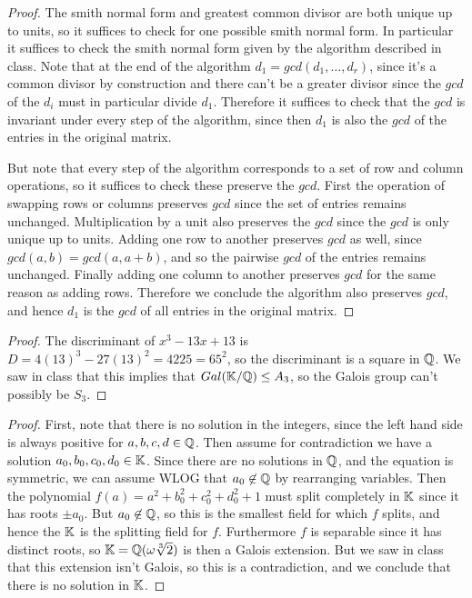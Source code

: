 \documentclass[11pt]{article}
\begin{document}
\begin{proof}
  The smith normal form and greatest common divisor are both unique up to units, so it suffices to check for one possible smith normal form.
  In particular it suffices to check the smith normal form given by the algorithm described in class.
  Note that at the end of the algorithm $d_1 = gcd(d_1,\dots,d_r)$, since it's a common divisor by construction and there can't be a greater divisor since the $gcd$ of the $d_i$ must in particular divide $d_1$.
  Therefore it suffices to check that the $gcd$ is invariant under every step of the algorithm, since then $d_1$ is also the $gcd$ of the entries in the original matrix.

  But note that every step of the algorithm corresponds to a set of row and column operations, so it suffices to check these preserve the $gcd$.
  First the operation of swapping rows or columns preserves $gcd$ since the set of entries remains unchanged.
  Multiplication by a unit also preserves the $gcd$ since the $gcd$ is only unique up to units.
  Adding one row to another preserves $gcd$ as well, since $gcd(a,b) = gcd(a,a+b)$, and so the pairwise $gcd$ of the entries remains unchanged.
  Finally adding one column to another preserves $gcd$ for the same reason as adding rows.
  Therefore we conclude the algorithm also preserves $gcd$, and hence $d_1$ is the $gcd$ of all entries in the original matrix.
\end{proof}

\begin{proof}
  The discriminant of $x^3 - 13x + 13$ is $D = 4(13)^3 - 27(13)^2 = 4225 = 65^2$, so the discriminant is a square in $\mathbb{Q}$.
  We saw in class that this implies that $Gal(\mathbb{K}/\mathbb{Q}) \le A_3$, so the Galois group can't possibly be $S_3$.
\end{proof}

\begin{proof}
  First, note that there is no solution in the integers, since the left hand side is always positive for $a,b,c,d \in \mathbb{Q}$.
  Then assume for contradiction we have a solution $a_0,b_0,c_0,d_0 \in \mathbb{K}$.
  Since there are no solutions in $\mathbb{Q}$, and the equation is symmetric, we can assume WLOG that $a_0 \not \in \mathbb{Q}$ by rearranging variables.
  Then the polynomial $f(a) = a^2 + b_0^2 + c_0^2 + d_0^2 + 1$ must split completely in $\mathbb{K}$ since it has roots $\pm a_0$.
  But $a_0 \not \in \mathbb{Q}$, so this is the smallest field for which $f$ splits, and hence the $\mathbb{K}$ is the splitting field for $f$.
  Furthermore $f$ is separable since it has distinct roots, so $\mathbb{K} = \mathbb{Q}(\omega\sqrt[3]{2})$ is then a Galois extension.
  But we saw in class that this extension isn't Galois, so this is a contradiction, and we conclude that there is no solution in $\mathbb{K}$.
\end{proof}
\end{document}
